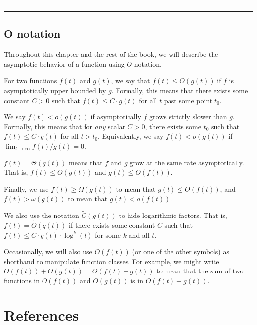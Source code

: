 \documentclass[
  letterpaper,
  DIV=11,
  numbers=noendperiod]{scrreprt}
\theoremstyle{plain}
\theoremstyle{plain}
\theoremstyle{definition}
\theoremstyle{definition}
\theoremstyle{remark}
\begin{document}
\begin{center}\rule{0.5\linewidth}{0.5pt}\end{center}

\begin{center}\rule{0.5\linewidth}{0.5pt}\end{center}

\section{O notation}\label{o-notation}

Throughout this chapter and the rest of the book, we will describe the
asymptotic behavior of a function using \(O\) notation.

For two functions \(f(t)\) and \(g(t)\), we say that
\(f(t) \le O(g(t))\) if \(f\) is asymptotically upper bounded by \(g\).
Formally, this means that there exists some constant \(C > 0\) such that
\(f(t) \le C \cdot g(t)\) for all \(t\) past some point \(t_0\).

We say \(f(t) < o(g(t))\) if asymptotically \(f\) grows strictly slower
than \(g\). Formally, this means that for \emph{any} scalar \(C > 0\),
there exists some \(t_0\) such that \(f(t) \le C \cdot g(t)\) for all
\(t > t_0\). Equivalently, we say \(f(t) < o(g(t))\) if
\(\lim_{t \to \infty} f(t)/g(t) = 0\).

\(f(t) = \Theta(g(t))\) means that \(f\) and \(g\) grow at the same rate
asymptotically. That is, \(f(t) \le O(g(t))\) and \(g(t) \le O(f(t))\).

Finally, we use \(f(t) \ge \Omega(g(t))\) to mean that
\(g(t) \le O(f(t))\), and \(f(t) > \omega(g(t))\) to mean that
\(g(t) < o(f(t))\).

We also use the notation \(\tilde O(g(t))\) to hide logarithmic factors.
That is, \(f(t) = \tilde O(g(t))\) if there exists some constant \(C\)
such that \(f(t) \le C \cdot g(t) \cdot \log^k(t)\) for some \(k\) and
all \(t\).

Occasionally, we will also use \(O(f(t))\) (or one of the other symbols)
as shorthand to manipulate function classes. For example, we might write
\(O(f(t)) + O(g(t)) = O(f(t) + g(t))\) to mean that the sum of two
functions in \(O(f(t))\) and \(O(g(t))\) is in \(O(f(t) + g(t))\).


\chapter*{References}\label{references-1}
\end{document}
